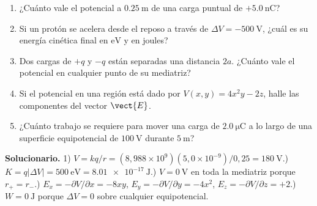 \documentclass[11pt]{article}
\begin{document}
\begin{enumerate}[leftmargin=*,itemsep=3pt]
  \item ¿Cuánto vale el potencial a $\SI{0,25}{\metre}$ de una carga puntual de $+\SI{5,0}{\nano\coulomb}$?
  \item Si un protón se acelera desde el reposo a través de $\Delta V=-\SI{500}{\volt}$, ¿cuál es su energía cinética final en $\mathrm{eV}$ y en joules?
  \item Dos cargas de $+q$ y $-q$ están separadas una distancia $2a$. ¿Cuánto vale el potencial en cualquier punto de su mediatriz?
  \item Si el potencial en una región está dado por $V(x,y)=4x^2y - 2z$, halle las componentes del vector $\vect{E}$.
  \item ¿Cuánto trabajo se requiere para mover una carga de $\SI{2,0}{\micro\coulomb}$ a lo largo de una superficie equipotencial de $\SI{100}{\volt}$ durante $\SI{5}{\metre}$?
\end{enumerate}

\medskip
{}

\medskip
{\sffamily\footnotesize\color{e10muted}\textbf{Solucionario.}
1) $V=kq/r=(8{,}988\times10^9)(5{,}0\times10^{-9})/0{,}25=\SI{180}{\volt}$.) $K=q|\Delta V|=\SI{500}{\electronvolt}=\SI{8,01e-17}{\joule}$.) $V=0\ \mathrm{V}$ en toda la mediatriz porque $r_+=r_-$.) $E_x=-\partial V/\partial x=-8xy$, $E_y=-\partial V/\partial y=-4x^2$, $E_z=-\partial V/\partial z=+2$.) $W=0\ \mathrm{J}$ porque $\Delta V=0$ sobre cualquier equipotencial.}
\end{document}
